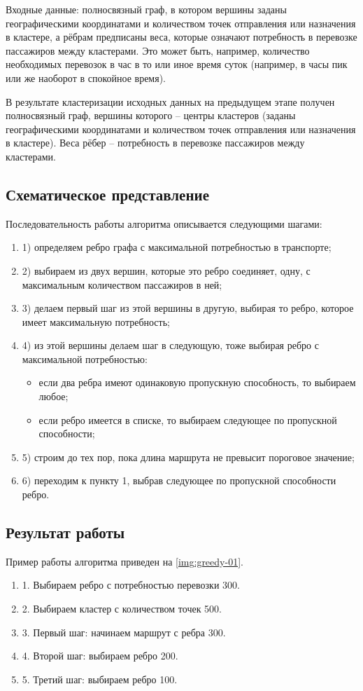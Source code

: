 Входные данные: полносвязный граф, в котором вершины заданы географическими координатами и количеством 
точек отправления или назначения в кластере, а рёбрам предписаны веса, которые означают потребность в 
перевозке пассажиров между кластерами. Это может быть, например, количество необходимых перевозок в час в то 
или иное время суток (например, в часы пик или же наоборот в спокойное время).

В результате кластеризации исходных данных на предыдущем этапе получен полносвязный граф, вершины 
которого -- центры кластеров (заданы географическими координатами и количеством точек отправления или 
назначения в кластере). Веса рёбер -- потребность в перевозке пассажиров между кластерами. 

\subsection{Схематическое представление}
Последовательность работы алгоритма описывается следующими шагами:
\begin{enumerate}
    \item 1) определяем ребро графа с максимальной потребностью в транспорте;
    \item 2) выбираем из двух вершин, которые это ребро соединяет, одну, с максимальным количеством 
        пассажиров в ней;
    \item 3) делаем первый шаг из этой вершины в другую, выбирая то ребро, которое имеет максимальную 
        потребность;
    \item 4) из этой вершины делаем шаг в следующую, тоже выбирая ребро с максимальной потребностью:
    \begin{itemize}
        \item если два ребра имеют одинаковую пропускную способность, то выбираем любое;
        \item если ребро имеется в списке, то выбираем следующее по пропускной способности;
    \end{itemize}
    \item 5) строим до тех пор, пока длина маршрута не превысит пороговое значение;
    \item 6) переходим к пункту 1, выбрав следующее по пропускной способности ребро.
\end{enumerate}

\subsection{Результат работы}
Пример работы алгоритма приведен на \ref{img:greedy-01}.
\begin{enumerate}
    \item 1. Выбираем ребро с потребностью перевозки 300.
    \item 2. Выбираем кластер с количеством точек 500.
    \item 3. Первый шаг: начинаем маршрут с ребра 300.
    \item 4. Второй шаг: выбираем ребро 200.
    \item 5. Третий шаг: выбираем ребро 100.
\end{enumerate}

